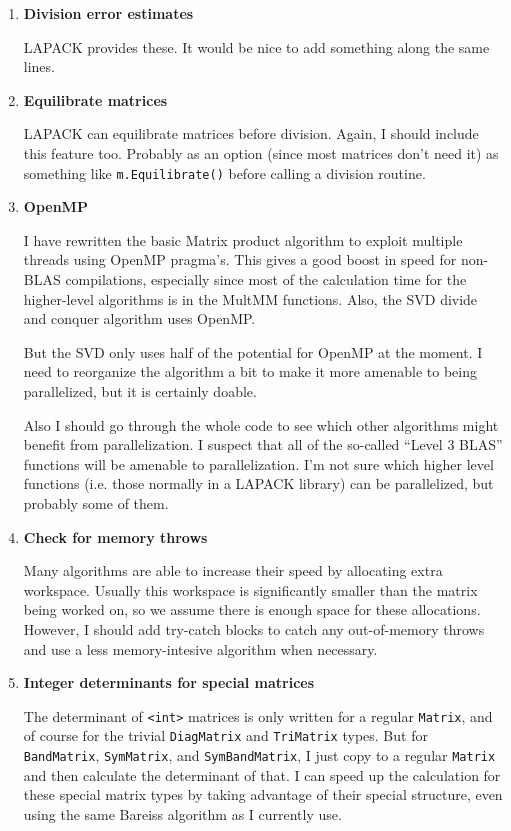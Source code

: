 \documentclass[twoside,letterpaper,11pt]{article}
\renewcommand{\tt}[1]{{\lstinline {#1}}}
\begin{document}
\begin{enumerate}
\item
\textbf{Division error estimates}

LAPACK provides these.  It would be nice to add something along the same lines.

\item
\textbf{Equilibrate matrices}

LAPACK can equilibrate matrices before division.  Again, I should include this
feature too.  Probably as an option (since most matrices don't need it)
as something like \tt{m.Equilibrate()} before calling a division routine.

\item
\textbf{OpenMP}

I have rewritten the basic Matrix product algorithm to exploit multiple threads using 
OpenMP pragma's.  This gives a good boost in speed for non-BLAS 
compilations, especially since most of the calculation time for the higher-level
algorithms is in the MultMM functions.  Also, the SVD divide and conquer
algorithm uses OpenMP.  

But the SVD only uses half of the potential for OpenMP at the moment.  I need
to reorganize the algorithm a bit to make it more amenable to being parallelized,
but it is certainly doable.

Also I should go through the whole code to
see which other algorithms might benefit from parallelization.  I suspect that all of
the so-called ``Level 3 BLAS'' functions will be amenable to parallelization.  I'm not sure
which higher level functions (i.e. those normally in a LAPACK library) can
be parallelized, but probably some of them.

\item
\textbf{Check for memory throws}

Many algorithms are able to increase their speed by allocating extra
workspace.  Usually this workspace is significantly smaller than the
matrix being worked on, so we assume there is enough space for 
these allocations.  However, I should add try-catch blocks to catch 
any out-of-memory throws and use a less memory-intesive algorithm
when necessary.

\item
\textbf{Integer determinants for special matrices}

The determinant of \tt{<int>} matrices is only written for a regular \tt{Matrix},
and of course for the trivial \tt{DiagMatrix} and \tt{TriMatrix} types.  But
for \tt{BandMatrix}, \tt{SymMatrix}, and \tt{SymBandMatrix}, I just copy to a regular
\tt{Matrix} and then calculate the determinant of that.  I can speed up the 
calculation for these special matrix types by taking advantage of their special
structure, even using the same Bareiss algorithm as I currently use.

\end{enumerate}
\end{document}
